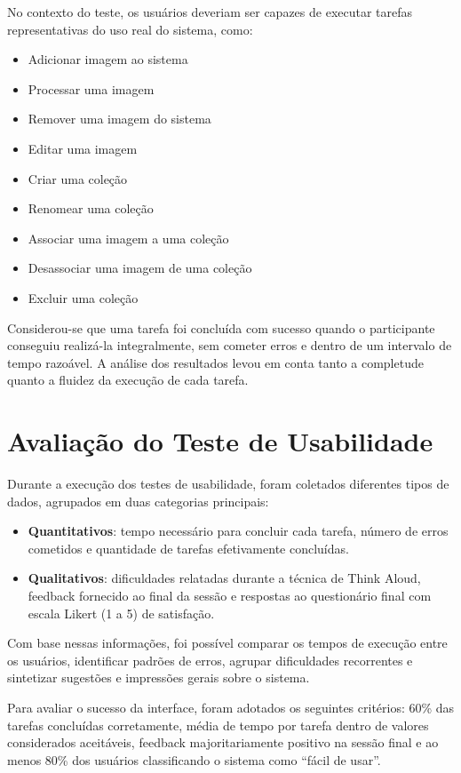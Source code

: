 No contexto do teste, os usuários deveriam ser capazes de executar tarefas representativas do uso real do sistema, como:
\begin{itemize}
    \item Adicionar imagem ao sistema
    \item Processar uma imagem
    \item Remover uma imagem do sistema
    \item Editar uma imagem
    \item Criar uma coleção
    \item Renomear uma coleção
    \item Associar uma imagem a uma coleção
    \item Desassociar uma imagem de uma coleção
    \item Excluir uma coleção
\end{itemize}

Considerou-se que uma tarefa foi concluída com sucesso quando o participante conseguiu realizá-la integralmente, sem cometer erros e dentro de um intervalo de tempo razoável. A análise dos resultados levou em conta tanto a completude quanto a fluidez da execução de cada tarefa.

\section{Avaliação do Teste de Usabilidade}
Durante a execução dos testes de usabilidade, foram coletados diferentes tipos de dados, agrupados em duas categorias principais:
\begin{itemize}
    \item \textbf{Quantitativos}: tempo necessário para concluir cada tarefa, número de erros cometidos e quantidade de tarefas efetivamente concluídas.
    \item \textbf{Qualitativos}: dificuldades relatadas durante a técnica de Think Aloud, feedback fornecido ao final da sessão e respostas ao questionário final com escala Likert (1 a 5) de satisfação.
\end{itemize}
Com base nessas informações, foi possível comparar os tempos de execução entre os usuários, identificar padrões de erros, agrupar dificuldades recorrentes e sintetizar sugestões e impressões gerais sobre o sistema.

Para avaliar o sucesso da interface, foram adotados os seguintes critérios: 60\% das tarefas concluídas corretamente, média de tempo por tarefa dentro de valores considerados aceitáveis, feedback majoritariamente positivo na sessão final e ao menos 80\% dos usuários classificando o sistema como “fácil de usar”.

